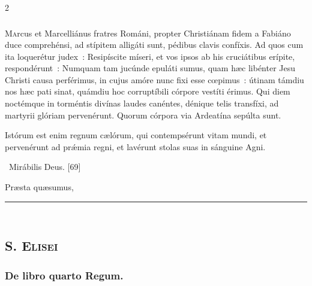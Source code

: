 \documentclass[9pt,twoside]{extarticle}
\begin{document}
\begin{multicols}{2}
{\subsubsection*{\center {}}
\lettrine{M}arcus et Marcelliánus fratres Románi, propter Christiánam fidem a Fabiáno duce comprehénsi, ad stípitem alligáti sunt, pédibus clavis confíxis. Ad quos cum ita loquerétur judex~: Resipíscite míseri, et vos ipsos ab his cruciátibus erípite, respondérunt~: Numquam tam jucúnde epuláti sumus, quam hæc libénter Jesu Christi causa perférimus, in cujus amóre nunc fixi esse cœpimus~: útinam támdiu nos hæc pati sinat, quámdiu hoc corruptíbili córpore vestíti érimus. Qui diem noctémque in torméntis divínas laudes canéntes, dénique telis transfíxi, ad martyrii glóriam pervenérunt. Quorum córpora via Ardeatína sepúlta sunt.

\begin{tightlist}{}
\item {} Istórum est enim regnum cælórum, qui contempsérunt vitam mundi, et pervenérunt ad prǽmia regni, et lavérunt stolas suas in sánguine Agni.
\item {}~Mirábilis Deus. [69]
\item {} Præsta quæsumus, 
\item {}
\end{tightlist}

\begin{center}\textcolor{red}{\rule{\linewidth}{0.5pt}} \end{center}

\subsection*{\center \textsc{\\
S. Elisei}}
\subsubsection*{\center {}}

\subsubsection*{\center De libro quarto Regum.}
}
\end{multicols}
\end{document}
